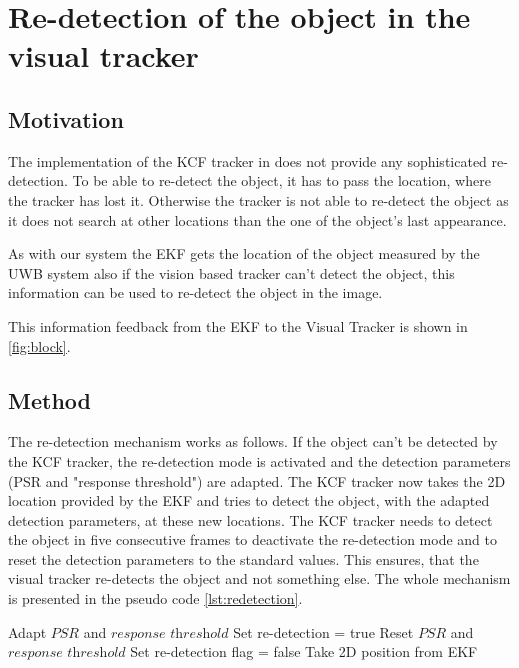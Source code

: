 
\chapter{Re-detection of the object in the visual tracker}\label{ch:redetecton}

\section{Motivation}
The implementation of the \acf{KCF} tracker in \cite{Haag:2015} does not provide any sophisticated re-detection. To be able to re-detect the object, it has to pass the location, where the tracker has lost it. Otherwise the tracker is not able to re-detect the object as it does not search at other locations than the one of the object's last appearance.

As with our system the \acf{EKF} gets the location of the object measured by the \acf{UWB} system also if the vision based tracker can't detect the object, this information can be used to re-detect the object in the image.

This information feedback from the \ac{EKF} to the Visual Tracker is shown in \autoref{fig:block}.

\section{Method}
The re-detection mechanism works as follows. If the object can't be detected by the \ac{KCF} tracker, the re-detection mode is activated and the detection parameters (PSR and "response threshold") are adapted. The \ac{KCF} tracker now takes the 2D location provided by the \ac{EKF} and tries to detect the object, with the adapted detection parameters, at these new locations. The \ac{KCF} tracker needs to detect the object in five consecutive frames to deactivate the re-detection mode and to reset the detection parameters to the standard values. This ensures, that the visual tracker re-detects the object and not something else.
The whole mechanism is presented in the pseudo code \autoref{lst:redetection}.

\begin{algorithm}
	\begin{algorithmic}[1]
				\State Adapt $\textit{PSR}$ and $\textit{response threshold}$
				\State Set re-detection = true
			\Else
					\State Reset $\textit{PSR}$ and $\textit{response threshold}$
					\State Set re-detection flag = false
				\EndIf
			\EndIf
				\State Take 2D position from \ac{EKF}
			\EndIf
		\EndWhile
	\end{algorithmic}
	\label{lst:redetection}
\end{algorithm}

